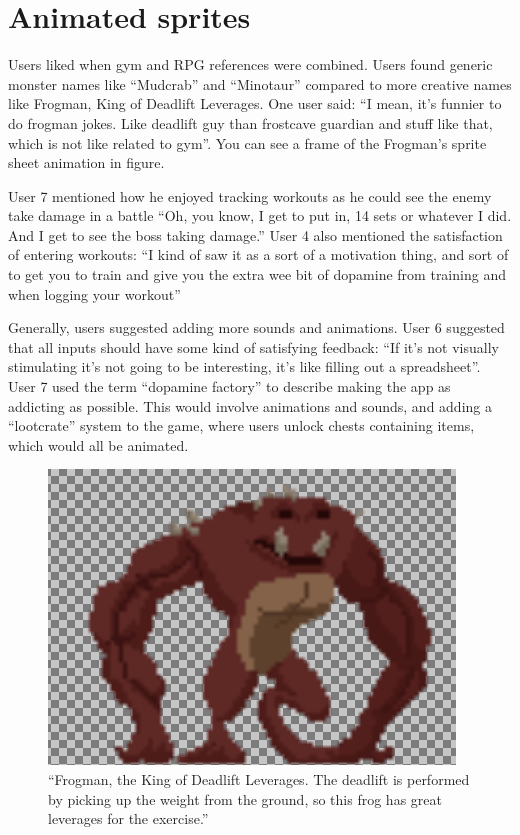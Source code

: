 \documentclass{l4proj}
\begin{document}
\section{Animated sprites}
Users liked when gym and RPG references were combined. Users found generic monster names like ``Mudcrab'' and ``Minotaur'' compared to more creative names like Frogman, King of Deadlift Leverages. One user said: ``I mean, it's funnier to do frogman jokes. Like deadlift guy than frostcave guardian and stuff like that, which is not like related to gym''. You can see a frame of the Frogman's sprite sheet animation in figure. 


User 7 mentioned how he enjoyed tracking workouts as he could see the enemy take damage in a battle ``Oh, you know, I get to put in, 14 sets or whatever I did. And I get to see the boss taking damage.'' User 4 also mentioned the satisfaction of entering workouts: ``I kind of saw it as a sort of a motivation thing, and sort of to get you to train and give you the extra wee bit of dopamine from training and when logging your workout''

Generally, users suggested adding more sounds and animations. User 6 suggested that all inputs should have some kind of satisfying feedback: ``If it's not visually stimulating it's not going to be interesting, it's like filling out a spreadsheet''. User 7 used the term ``dopamine factory'' to describe making the app as addicting as possible. This would involve animations and sounds, and adding a ``lootcrate'' system to the game, where users unlock chests containing items, which would all be animated. 

\begin{figure}[H]
    \centering
    \includegraphics[width=1.0\linewidth]{froggie.png}    
    \caption{
      ``Frogman, the King of Deadlift Leverages. The deadlift is performed by picking up the weight from the ground, so this frog has great leverages for the exercise.''
    }
    \label{fig:frogman} 
\end{figure}
\end{document}
